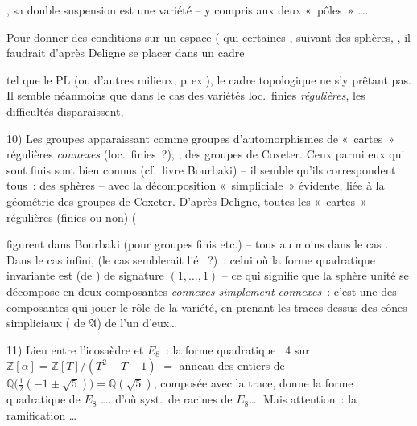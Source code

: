 \documentclass[11pt,a4paper]{article}
\begin{document}
, sa double suspension est une variété -- y compris
aux deux «~pôles~» ….

Pour donner  des
conditions \struck{\ill{}} sur un espace  \struck{\ill{}} 
(  \add{\ill{}} qui
  certaines
, suivant des sphères, \struck{\ill{}}, il
faudrait d'après Deligne se placer dans un cadre

tel que le PL (ou d'autres milieux, \ill{} p.\,ex.), le cadre topologique
ne s'y prêtant pas. Il semble néanmoins que dans le cas des variétés
loc.\ finies \emph{régulières}, les difficultés disparaissent,


10) Les groupes apparaissant comme groupes d'automorphismes de «~cartes~»
régulières \struck{\ill{}} \emph{connexes} (loc.\ finies~?),
\struck{\ill{}}  , 
des groupes de Coxeter.  Ceux parmi eux qui sont finis sont
bien connus (cf.\ livre Bourbaki) -- il semble qu'ils correspondent tous~:
des sphères -- avec la décomposition «~simpliciale~» évidente, liée à la
géométrie des groupes de Coxeter. D'après Deligne, toutes les «~cartes~»
régulières  (finies ou non) (

figurent dans Bourbaki (pour groupes  finis etc.) --
tous au moins dans le cas . Dans le cas infini,
(le cas semblerait lié ~?)~: celui où la
forme quadratique invariante est (de  \ill{}) de
signature $(1,\dots,1)$ -- ce qui signifie que la sphère unité se
décompose en deux composantes \emph{connexes simplement connexes}~:
c'est une des composantes qui  jouer le rôle de la
\struck{\ill{}} variété, en prenant les traces dessus des cônes
simpliciaux (\ill{} de $\mathfrak{A}$) de l'un d'eux…

11) Lien entre l'icosaèdre et $E_8$~: la forme quadratique
~4 sur $\mathbb{Z}[\alpha]=\mathbb{Z}[T]/(T^2+T-1)$
$=$ anneau des entiers de
$\mathbb{Q}\bigl(\tfrac12(-1\pm\sqrt5)\bigr)=\mathbb{Q}(\sqrt5)$,
 composée avec la trace, donne la forme quadratique de
$E_8$ …. d'où syst.\ de racines de $E_8$…. Mais attention~: la
ramification  …
\end{document}
